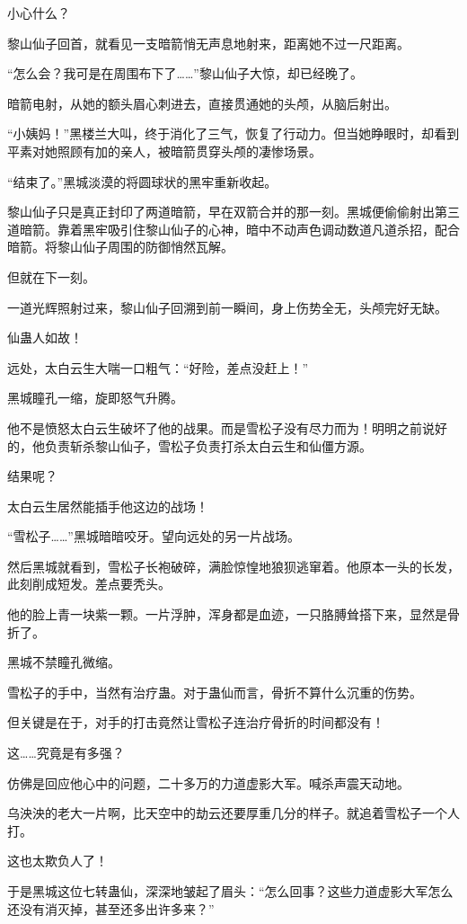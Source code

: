 \begin{this_body}
小心什么？

黎山仙子回首，就看见一支暗箭悄无声息地射来，距离她不过一尺距离。

“怎么会？我可是在周围布下了……”黎山仙子大惊，却已经晚了。

暗箭电射，从她的额头眉心刺进去，直接贯通她的头颅，从脑后射出。

“小姨妈！”黑楼兰大叫，终于消化了三气，恢复了行动力。但当她睁眼时，却看到平素对她照顾有加的亲人，被暗箭贯穿头颅的凄惨场景。

“结束了。”黑城淡漠的将圆球状的黑牢重新收起。

黎山仙子只是真正封印了两道暗箭，早在双箭合并的那一刻。黑城便偷偷射出第三道暗箭。靠着黑牢吸引住黎山仙子的心神，暗中不动声色调动数道凡道杀招，配合暗箭。将黎山仙子周围的防御悄然瓦解。

但就在下一刻。

一道光辉照射过来，黎山仙子回溯到前一瞬间，身上伤势全无，头颅完好无缺。

仙蛊人如故！

远处，太白云生大喘一口粗气：“好险，差点没赶上！”

黑城瞳孔一缩，旋即怒气升腾。

他不是愤怒太白云生破坏了他的战果。而是雪松子没有尽力而为！明明之前说好的，他负责斩杀黎山仙子，雪松子负责打杀太白云生和仙僵方源。

结果呢？

太白云生居然能插手他这边的战场！

“雪松子……”黑城暗暗咬牙。望向远处的另一片战场。

然后黑城就看到，雪松子长袍破碎，满脸惊惶地狼狈逃窜着。他原本一头的长发，此刻削成短发。差点要秃头。

他的脸上青一块紫一颗。一片浮肿，浑身都是血迹，一只胳膊耸搭下来，显然是骨折了。

黑城不禁瞳孔微缩。

雪松子的手中，当然有治疗蛊。对于蛊仙而言，骨折不算什么沉重的伤势。

但关键是在于，对手的打击竟然让雪松子连治疗骨折的时间都没有！

这……究竟是有多强？

仿佛是回应他心中的问题，二十多万的力道虚影大军。喊杀声震天动地。

乌泱泱的老大一片啊，比天空中的劫云还要厚重几分的样子。就追着雪松子一个人打。

这也太欺负人了！

于是黑城这位七转蛊仙，深深地皱起了眉头：“怎么回事？这些力道虚影大军怎么还没有消灭掉，甚至还多出许多来？”


\end{this_body}
